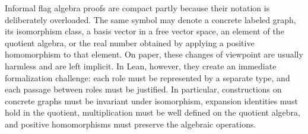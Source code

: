 \documentclass{article}
\newcommand{\tdensity}[2]{\pi(#1;\,#2)}
\newcommand{\lean}[1]{\texttt{#1}}
\newcommand{\Ext}{\operatorname{Ext}}
\begin{document}

Informal flag algebra proofs are compact partly because their notation is
deliberately overloaded.  The same symbol may denote a concrete labeled graph,
its isomorphism class, a basis vector in a free vector space, an element of the
quotient algebra, or the real number obtained by applying a positive
homomorphism to that element.  On paper, these changes of viewpoint are usually
harmless and are left implicit.  In Lean, however, they create an immediate
formalization challenge: each role must be represented by a separate type, and
each passage between roles must be justified.  In particular, constructions
on concrete graphs must be invariant under isomorphism, expansion identities
must hold in the quotient, multiplication must be well defined on the quotient
algebra, and positive homomorphisms must preserve the algebraic operations.
\end{document}
